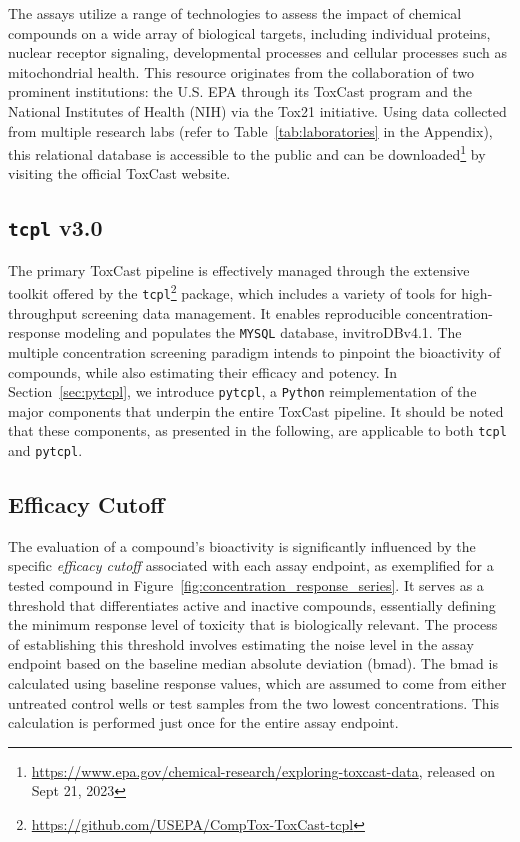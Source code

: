 The assays utilize a range of technologies to assess the impact of chemical compounds on a wide array of biological targets, including individual proteins, nuclear receptor signaling, developmental processes and cellular processes such as mitochondrial health. This resource originates from the collaboration of two prominent institutions: the  U.S. EPA through its ToxCast program and the National Institutes of Health (NIH) via the Tox21 initiative. Using data collected from multiple research labs (refer to Table~\ref{tab:laboratories} in the Appendix), this relational database is accessible to the public and can be downloaded\footnote{\url{https://www.epa.gov/chemical-research/exploring-toxcast-data}, released on Sept 21, 2023} by visiting the official ToxCast website.

\subsection{\texttt{tcpl} v3.0}
The primary ToxCast pipeline is effectively managed through the extensive toolkit offered by the \texttt{tcpl}\footnote{\url{https://github.com/USEPA/CompTox-ToxCast-tcpl}} package, which includes a variety of tools for high-throughput screening data management. It enables reproducible concentration-response modeling and populates the \texttt{MYSQL} database, invitroDBv4.1. The multiple concentration screening paradigm intends to pinpoint the bioactivity of compounds, while also estimating their efficacy and potency. In Section~\ref{sec:pytcpl}, we introduce \texttt{pytcpl}, a \texttt{Python} reimplementation of the major components that underpin the entire ToxCast pipeline. It should be noted that these components, as presented in the following, are applicable to both \texttt{tcpl} and \texttt{pytcpl}.

\subsection{Efficacy Cutoff}
The evaluation of a compound's bioactivity is significantly influenced by the specific \emph{efficacy cutoff} associated with each assay endpoint, as exemplified for a tested compound in Figure~\ref{fig:concentration_response_series}. It serves as a threshold that differentiates active and inactive compounds, essentially defining the minimum response level of toxicity that is biologically relevant. The process of establishing this threshold involves estimating the noise level in the assay endpoint based on the baseline median absolute deviation (bmad). The bmad is calculated using baseline response values, which are assumed to come from either untreated control wells or test samples from the two lowest concentrations. This calculation is performed just once for the entire assay endpoint.

